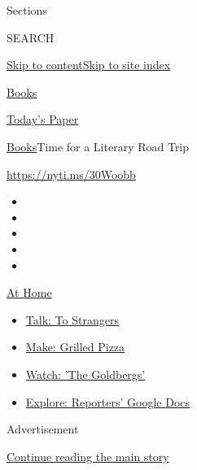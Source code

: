 Sections

SEARCH

\protect\hyperlink{site-content}{Skip to
content}\protect\hyperlink{site-index}{Skip to site index}

\href{https://www.nytimes.com/section/books}{Books}

\href{https://myaccount.nytimes.com/auth/login?response_type=cookie\&client_id=vi}{}

\href{https://www.nytimes.com/section/todayspaper}{Today's Paper}

\href{/section/books}{Books}\textbar{}Time for a Literary Road Trip

\url{https://nyti.ms/30Woobb}

\begin{itemize}
\item
\item
\item
\item
\item
\end{itemize}

\href{https://www.nytimes.com/spotlight/at-home?action=click\&pgtype=Article\&state=default\&region=TOP_BANNER\&context=at_home_menu}{At
Home}

\begin{itemize}
\tightlist
\item
  \href{https://www.nytimes.com/2020/08/03/well/family/the-benefits-of-talking-to-strangers.html?action=click\&pgtype=Article\&state=default\&region=TOP_BANNER\&context=at_home_menu}{Talk:
  To Strangers}
\item
  \href{https://www.nytimes.com/2020/08/01/at-home/coronavirus-make-pizza-on-a-grill.html?action=click\&pgtype=Article\&state=default\&region=TOP_BANNER\&context=at_home_menu}{Make:
  Grilled Pizza}
\item
  \href{https://www.nytimes.com/2020/07/31/arts/television/goldbergs-abc-stream.html?action=click\&pgtype=Article\&state=default\&region=TOP_BANNER\&context=at_home_menu}{Watch:
  'The Goldbergs'}
\item
  \href{https://www.nytimes.com/interactive/2020/at-home/even-more-reporters-editors-diaries-lists-recommendations.html?action=click\&pgtype=Article\&state=default\&region=TOP_BANNER\&context=at_home_menu}{Explore:
  Reporters' Google Docs}
\end{itemize}

Advertisement

\protect\hyperlink{after-top}{Continue reading the main story}

